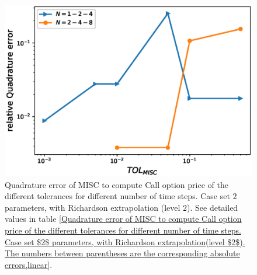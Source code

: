 \begin{figure}[h!]
	\centering
	\includegraphics[width=0.5\linewidth]{./figures/rBergomi_MISC_quadratre_error/vs_TOL/set2/relative_quad_error_wrt_MISC_TOL_set2_rich_level2_linear}
	
	
	\caption{Quadrature error of MISC to compute Call option price of the different tolerances for different number of time steps. Case  set $2$ parameters, with Richardson extrapolation (level $2$).  See detailed values  in table \ref{Quadrature error of MISC to compute Call option price of the different tolerances for different number of time steps. Case set $2$ parameters, with Richardson extrapolation(level $2$). The numbers between parentheses are the corresponding absolute errors,linear}.}
	\label{fig:Quadrature_error_set2_rich_linear}
\end{figure}


